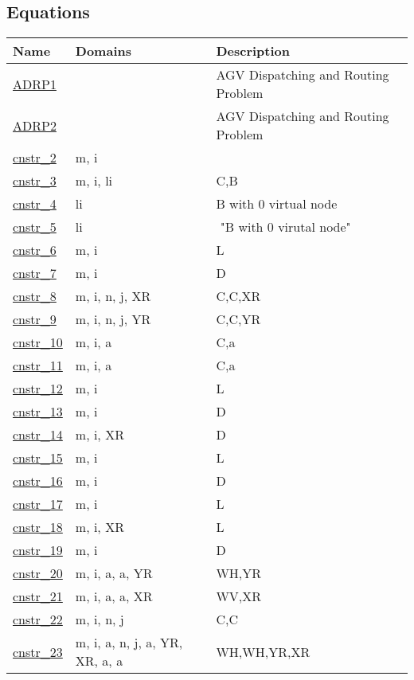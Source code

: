 \documentclass[11pt]{article}
\begin{document}
\subsection*{Equations}
\begin{tabularx}{\textwidth}{| l | l | X |} 
\hline 
\textbf{Name} & \textbf{Domains} & \textbf{Description}\\ 
\hline 
\endhead 
\hyperref[ADRP1]{ADRP1}  &  & AGV Dispatching and Routing Problem \\ 
\hyperref[ADRP2]{ADRP2}  &  & AGV Dispatching and Routing Problem \\ 
\hyperref[cnstr_2]{cnstr\_2}  & m, i &  \\ 
\hyperref[cnstr_3]{cnstr\_3}  & m, i, li & C,B \\ 
\hyperref[cnstr_4]{cnstr\_4}  & li & B with 0 virtual node \\ 
\hyperref[cnstr_5]{cnstr\_5}  & li & ‌  "B with 0 virutal node" \\ 
\hyperref[cnstr_6]{cnstr\_6}  & m, i & L \\ 
\hyperref[cnstr_7]{cnstr\_7}  & m, i & D \\ 
\hyperref[cnstr_8]{cnstr\_8}  & m, i, n, j, XR & C,C,XR \\ 
\hyperref[cnstr_9]{cnstr\_9}  & m, i, n, j, YR & C,C,YR \\ 
\hyperref[cnstr_10]{cnstr\_10}  & m, i, a & C,a \\ 
\hyperref[cnstr_11]{cnstr\_11}  & m, i, a & C,a \\ 
\hyperref[cnstr_12]{cnstr\_12}  & m, i & L \\ 
\hyperref[cnstr_13]{cnstr\_13}  & m, i & D \\ 
\hyperref[cnstr_14]{cnstr\_14}  & m, i, XR & D \\ 
\hyperref[cnstr_15]{cnstr\_15}  & m, i & L \\ 
\hyperref[cnstr_16]{cnstr\_16}  & m, i & D \\ 
\hyperref[cnstr_17]{cnstr\_17}  & m, i & L \\ 
\hyperref[cnstr_18]{cnstr\_18}  & m, i, XR & L \\ 
\hyperref[cnstr_19]{cnstr\_19}  & m, i & D \\ 
\hyperref[cnstr_20]{cnstr\_20}  & m, i, a, a, YR & WH,YR \\ 
\hyperref[cnstr_21]{cnstr\_21}  & m, i, a, a, XR & WV,XR \\ 
\hyperref[cnstr_22]{cnstr\_22}  & m, i, n, j & C,C \\ 
\hyperref[cnstr_23]{cnstr\_23}  & m, i, a, n, j, a, YR, XR, a, a & WH,WH,YR,XR \\ 

\end{tabularx}
\end{document}
